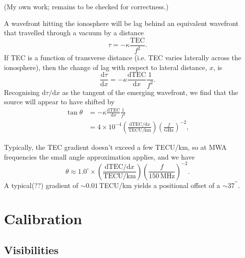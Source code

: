 \documentclass{book}
\newcommand{\deriv}[2]{\frac{\text{d}{#1}}{\text{d}{#2}}}
\begin{document}
(My own work; remains to be checked for correctness.)

A wavefront hitting the ionosphere will be lag behind an equivalent wavefront that travelled through a vacuum by a distance
\begin{equation}
    \tau = -\kappa\frac{\text{TEC}}{f^2}.
\end{equation}
If TEC is a function of transverse distance (i.e. TEC varies laterally across the ionosphere), then the change of lag with respect to lateral distance, $x$, is
\begin{equation}
    \deriv{\tau}{x} = -\kappa\deriv{\text{TEC}}{x} \frac{1}{f^2}.
\end{equation}
Recognising $\text{d}\tau/\text{d}x$ as the tangent of the emerging wavefront, we find that the source will appear to have shifted by
\begin{align}
    \tan\theta
        &= -\kappa\deriv{\text{TEC}}{x} \frac{1}{f^2} \\
        &= 4\times10^{-4} \left(\frac{\text{dTEC}/\text{d}x}{\text{TECU/km}}\right) \left(\frac{f}{\text{GHz}}\right)^{-2},
\end{align}

Typically, the TEC gradient doesn't exceed a few TECU/km, so at MWA frequencies the small angle approximation applies, and we have
\begin{equation}
    \theta \approx 1.0^\circ \times \left(\frac{\text{dTEC}/\text{d}x}{\text{TECU/km}}\right) \left(\frac{f}{150\,\text{MHz}}\right)^{-2}.
\end{equation}
A typical(??) gradient of ${\sim}0.01\,$TECU/km yields a positional offset of a ${\sim}37^{\prime\prime}$.

\chapter{Calibration}

\section{Visibilities}
\end{document}
